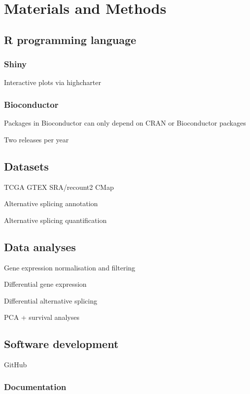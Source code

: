 \chapter{Materials and Methods}

\section{R programming language}

\subsection{Shiny}

Interactive plots via highcharter

\subsection{Bioconductor}

Packages in Bioconductor can only depend on CRAN or Bioconductor packages

Two releases per year

\section{Datasets}

TCGA
GTEX
SRA/recount2
CMap

Alternative splicing annotation

Alternative splicing quantification

\section{Data analyses}

Gene expression normalisation and filtering

Differential gene expression

Differential alternative splicing

PCA + survival analyses

\section{Software development}

GitHub

\subsection{Documentation}

